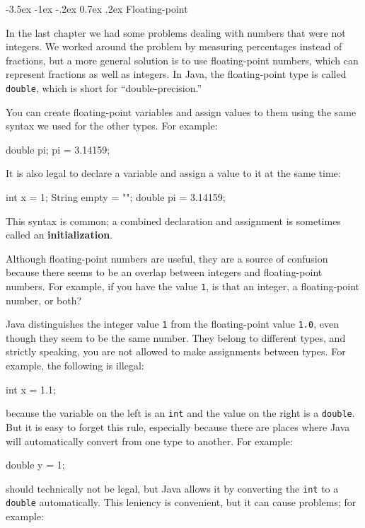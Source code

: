 \documentclass{book}
\makeatletter
\renewcommand{\section}{\@startsection 
    {section} {1} {0mm}%
    {-3.5ex \@plus -1ex \@minus -.2ex}%
    {0.7ex \@plus.2ex}%
    {\normalfont\Large\bfseries}}
\makeatother
\begin{document}
\section{Floating-point}

In the last chapter we had some problems dealing with numbers
that were not integers.  We worked around the problem by measuring
percentages instead of fractions, but a more general solution is
to use floating-point numbers, which can represent fractions
as well as integers.  In Java, the floating-point type is
called {\tt double}, which is short for ``double-precision.''

You can create floating-point variables and assign values to them
using the same syntax we used for the other types.  For example:

\begin{verbatimtab}
    double pi;
    pi = 3.14159;
\end{verbatimtab}
%
It is also legal to declare a variable and assign a value to it at the
same time:

\begin{verbatimtab}
    int x = 1;
    String empty = "";
    double pi = 3.14159;
\end{verbatimtab}
%
This syntax is common; a combined declaration
and assignment is sometimes called an {\bf initialization}.

Although floating-point numbers are useful, they are
a source of confusion because there seems to be an
overlap between integers and floating-point numbers.  For
example, if you have the value {\tt 1}, is that an integer,
a floating-point number, or both?

Java distinguishes the integer value {\tt 1}
from the floating-point value {\tt 1.0}, even though they
seem to be the same number.  They belong to
different types, and strictly speaking, you are not allowed
to make assignments between types.  For example, the following
is illegal:

\begin{verbatimtab}
    int x = 1.1;
\end{verbatimtab}
%
because the variable on the left is an {\tt int}
and the value on the right is a {\tt double}.  But it is easy
to forget this rule, especially because there are places where Java
will automatically convert from one type to another.
For example:

\begin{verbatimtab}
    double y = 1;
\end{verbatimtab}
%
should technically not be legal, but Java allows it by converting the
{\tt int} to a {\tt double} automatically.  This leniency is
convenient, but it can cause problems; for example:
\end{document}
